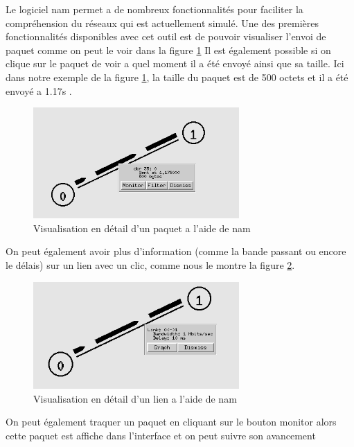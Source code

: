 \documentclass[11pt]{article}
\begin{document}
Le logiciel nam permet a de nombreux fonctionnalités pour faciliter la compréhension du réseaux qui est actuellement simulé. Une des premières fonctionnalités disponibles avec cet outil est de pouvoir visualiser l’envoi de paquet comme on peut le voir dans la figure \ref{visuPaquet} Il est également possible si on clique sur le paquet de voir a quel moment il a été envoyé ainsi que sa taille. Ici dans notre exemple de la figure \ref{visuPaquet}, la taille du paquet est de 500 octets et il a été envoyé a 1.17s .

\begin{figure}[H]
	\begin{center}
		\includegraphics[width=0.7\textwidth]{assets/tp1/visualisationpaquet.png}
	\end{center}
	\caption{Visualisation en détail d'un paquet a l'aide de nam}
	\label{visuPaquet}
\end{figure}

On peut également avoir plus d'information (comme la bande passant ou encore le délais) sur un lien avec un clic, comme nous le montre la figure \ref{visuLien}.

\begin{figure}[H]
	\begin{center}
		\includegraphics[width=0.7\textwidth]{assets/tp1/visualisationLien.png}
	\end{center}
	\caption{Visualisation en détail d'un lien a l'aide de nam}
	\label{visuLien}
\end{figure}

On peut également traquer un paquet en cliquant sur le bouton monitor alors cette paquet est affiche dans l'interface et on peut suivre son avancement
\end{document}

